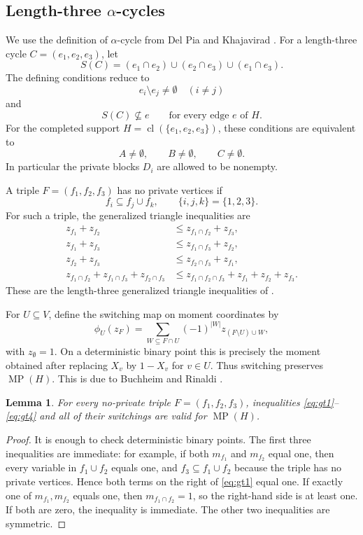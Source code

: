 \documentclass[11pt]{article}
\newtheorem{lemma}[theorem]{Lemma}
\theoremstyle{definition}
\theoremstyle{remark}
\newcommand{\cl}{\operatorname{cl}}
\newcommand{\MP}{\operatorname{MP}}
\begin{document}
\begin{editedaiblock}
\subsection{Length-three \texorpdfstring{$\alpha$}{alpha}-cycles}

We use the definition of $\alpha$-cycle from Del Pia and Khajavirad \cite[Definition 2]{delpia2026cer}. For a length-three cycle $C=(e_1,e_2,e_3)$, let
\[
S(C)=(e_1\cap e_2)\cup(e_2\cap e_3)\cup(e_1\cap e_3).
\]
The defining conditions reduce to
\[
e_i\setminus e_j\neq\emptyset\quad(i\neq j)
\]
and
\[
S(C)\not\subseteq e\qquad\text{for every edge }e\text{ of }H.
\]
For the completed support $H=\cl(\{e_1,e_2,e_3\})$, these conditions are equivalent to
\[
A\neq\emptyset,\qquad B\neq\emptyset,\qquad C\neq\emptyset.
\]
In particular the private blocks $D_i$ are allowed to be nonempty.

A triple $F=(f_1,f_2,f_3)$ has no private vertices if
\[
f_i\subseteq f_j\cup f_k,\qquad \{i,j,k\}=\{1,2,3\}.
\]
For such a triple, the generalized triangle inequalities are
\begin{align}
 z_{f_1}+z_{f_2}&\le z_{f_1\cap f_2}+z_{f_3},\label{eq:gt1}\\
 z_{f_1}+z_{f_3}&\le z_{f_1\cap f_3}+z_{f_2},\label{eq:gt2}\\
 z_{f_2}+z_{f_3}&\le z_{f_2\cap f_3}+z_{f_1},\label{eq:gt3}\\
 z_{f_1\cap f_2}+z_{f_1\cap f_3}+z_{f_2\cap f_3}
 &\le z_{f_1\cap f_2\cap f_3}+z_{f_1}+z_{f_2}+z_{f_3}.
 \label{eq:gt4}
\end{align}
These are the length-three generalized triangle inequalities of \cite[Proposition 7]{delpia2026cer}.

For $U\subseteq V$, define the switching map on moment coordinates by
\[
\phi_U(z_F)=\sum_{W\subseteq F\cap U}(-1)^{|W|}z_{(F\setminus U)\cup W},
\]
with $z_\emptyset=1$. On a deterministic binary point this is precisely the moment obtained after replacing $X_v$ by $1-X_v$ for $v\in U$. Thus switching preserves $\MP(H)$.  This is due to Buchheim and Rinaldi \cite{buchheim2008efficient}.

\begin{lemma}\label{lem:gt-valid}
For every no-private triple $F=(f_1,f_2,f_3)$, inequalities \eqref{eq:gt1}--\eqref{eq:gt4} and all of their switchings are valid for $\MP(H)$.
\end{lemma}

\begin{proof}
It is enough to check deterministic binary points. The first three inequalities are immediate: for example, if both $m_{f_1}$ and $m_{f_2}$ equal one, then every variable in $f_1\cup f_2$ equals one, and $f_3\subseteq f_1\cup f_2$ because the triple has no private vertices. Hence both terms on the right of \eqref{eq:gt1} equal one. If exactly one of $m_{f_1},m_{f_2}$ equals one, then $m_{f_1\cap f_2}=1$, so the right-hand side is at least one. If both are zero, the inequality is immediate. The other two inequalities are symmetric.


\end{proof}
\end{editedaiblock}
\end{document}
